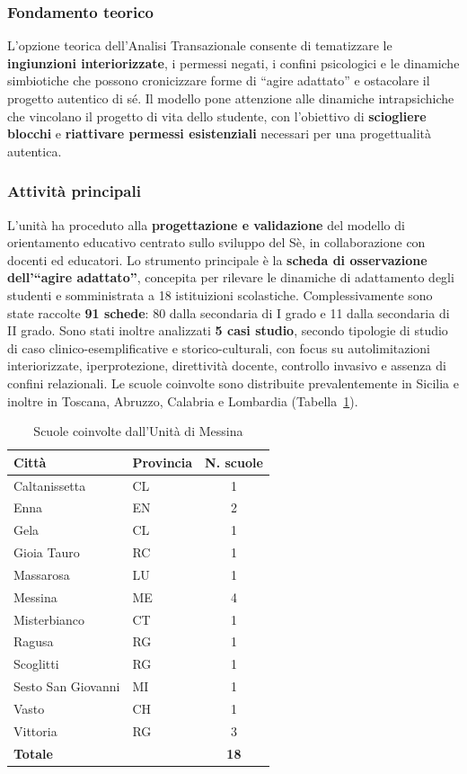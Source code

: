 \documentclass[12pt,a4paper]{article}
\begin{document}
\subsubsection{Fondamento teorico}

L'opzione teorica dell'Analisi Transazionale consente di tematizzare le \textbf{ingiunzioni interiorizzate}, i permessi negati, i confini psicologici e le dinamiche simbiotiche che possono cronicizzare forme di ``agire adattato'' e ostacolare il progetto autentico di s\'e. Il modello pone attenzione alle dinamiche intrapsichiche che vincolano il progetto di vita dello studente, con l'obiettivo di \textbf{sciogliere blocchi} e \textbf{riattivare permessi esistenziali} necessari per una progettualit\`a autentica.

\subsubsection{Attivit\`a principali}

L'unit\`a ha proceduto alla \textbf{progettazione e validazione} del modello di orientamento educativo centrato sullo sviluppo del S\`e, in collaborazione con docenti ed educatori. Lo strumento principale \`e la \textbf{scheda di osservazione dell'``agire adattato''}, concepita per rilevare le dinamiche di adattamento degli studenti e somministrata a 18 istituizioni scolastiche. Complessivamente sono state raccolte \textbf{91 schede}: 80 dalla secondaria di I grado e 11 dalla secondaria di II grado. Sono stati inoltre analizzati \textbf{5 casi studio}, secondo tipologie di studio di caso clinico-esemplificative e storico-culturali, con focus su autolimitazioni interiorizzate, iperprotezione, direttivit\`a docente, controllo invasivo e assenza di confini relazionali. Le scuole coinvolte sono distribuite prevalentemente in Sicilia e inoltre in Toscana, Abruzzo, Calabria e Lombardia (Tabella~\ref{tab:messina_scuole}).

\begin{table}[h]
\centering
\caption{Scuole coinvolte dall'Unit\`a di Messina}
\label{tab:messina_scuole}
\small
\begin{tabular}{llc}
\toprule
\textbf{Citt\`a} & \textbf{Provincia} & \textbf{N. scuole} \\
\midrule
Caltanissetta & CL & 1 \\
Enna & EN & 2 \\
Gela & CL & 1 \\
Gioia Tauro & RC & 1 \\
Massarosa & LU & 1 \\
Messina & ME & 4 \\
Misterbianco & CT & 1 \\
Ragusa & RG & 1 \\
Scoglitti & RG & 1 \\
Sesto San Giovanni & MI & 1 \\
Vasto & CH & 1 \\
Vittoria & RG & 3 \\
\midrule
\textbf{Totale} & & \textbf{18} \\
\bottomrule
\end{tabular}
\end{table}
\end{document}
